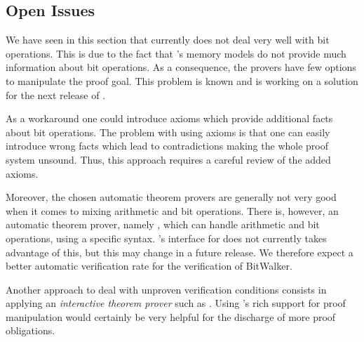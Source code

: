 \clearpage

\subsection{Open Issues}
\label{issues}


We have seen in this section that \wpframac currently does not deal very well with bit operations.
This is due to the fact that \wpframac's memory models do not provide 
much information about bit operations.
As a consequence, the provers have few options to manipulate the proof goal.
This problem is known and \cealist is working on a solution for the next release of \wpframac.

As a workaround one could introduce axioms which provide
additional facts about bit operations. 
The problem with using axioms is that one can easily introduce wrong facts
which lead to contradictions making the whole proof system unsound. 
Thus, this approach requires a careful review of the added axioms.

Moreover, the chosen automatic theorem provers are generally not very
good when it comes to mixing arithmetic and bit operations.
There is, however, an automatic theorem prover, namely \z,
which can handle arithmetic and bit operations, using a specific syntax.
\framac's interface for \z does not currently takes advantage of this, 
but this may change in a future release.
We therefore expect a better automatic verification rate for the verification of BitWalker.

Another approach to deal with unproven verification conditions consists in
applying an \emph{interactive theorem prover} such as \coq.
Using \coq's rich support for proof manipulation would certainly be very helpful
for the discharge of more proof obligations.

